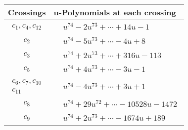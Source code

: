 \documentclass[1p]{elsarticle_modified}
\theoremstyle{definition}
\begin{document}
\begin{tabular}{m{50pt}|m{274pt}}
Crossings & \hspace{64pt}u-Polynomials at each crossing \\
\hline $$\begin{aligned}c_{1},c_{4},c_{12}\end{aligned}$$&$\begin{aligned}
&u^{74}-2 u^{73}+\cdots+14 u-1
\end{aligned}$\\
\hline $$\begin{aligned}c_{2}\end{aligned}$$&$\begin{aligned}
&u^{74}-5 u^{73}+\cdots-4 u+8
\end{aligned}$\\
\hline $$\begin{aligned}c_{3}\end{aligned}$$&$\begin{aligned}
&u^{74}+2 u^{73}+\cdots+316 u-113
\end{aligned}$\\
\hline $$\begin{aligned}c_{5}\end{aligned}$$&$\begin{aligned}
&u^{74}+4 u^{73}+\cdots-3 u-1
\end{aligned}$\\
\hline $$\begin{aligned}c_{6},c_{7},c_{10}\\c_{11}\end{aligned}$$&$\begin{aligned}
&u^{74}-4 u^{73}+\cdots+3 u+1
\end{aligned}$\\
\hline $$\begin{aligned}c_{8}\end{aligned}$$&$\begin{aligned}
&u^{74}+29 u^{72}+\cdots-10528 u-1472
\end{aligned}$\\
\hline $$\begin{aligned}c_{9}\end{aligned}$$&$\begin{aligned}
&u^{74}+2 u^{73}+\cdots-1674 u+189
\end{aligned}$\\
\hline
\end{tabular}\\~\\
\end{document}
